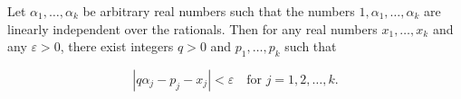 Let $\alpha_1, \ldots, \alpha_k$ be arbitrary real numbers such that the numbers $1, \alpha_1, \ldots, \alpha_k$ are linearly independent over the rationals. Then for any real numbers $x_1, \ldots, x_k$ and any $\varepsilon > 0$, there exist integers $q > 0$ and $p_1, \ldots, p_k$ such that

$$|q\alpha_j - p_j - x_j| < \varepsilon \quad \text{for } j = 1, 2, \ldots, k.$$
